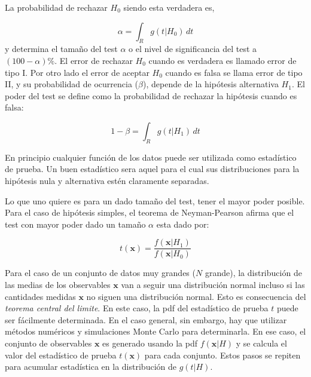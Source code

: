 La probabilidad de rechazar $H_0$ siendo esta verdadera es,

\begin{equation}
  \alpha = \int_{R} g(t|H_0)\, dt
\end{equation}
%
y determina el tama\~no del test $\alpha$ o el nivel de significancia del test a
$(100 - \alpha) \%$. El error de rechazar $H_0$ cuando es verdadera es llamado
error de tipo I. Por otro lado el error de aceptar $H_0$ cuando es falsa se
llama error de tipo II, y su probabilidad de ocurrencia ($\beta$), depende de la
hipótesis alternativa $H_1$. El poder del test se define como la probabilidad de
rechazar la hipótesis cuando es falsa:

\begin{equation}
1-\beta = \int_R g(t|H_1)\, dt
\end{equation}

En principio cualquier función de los datos puede ser utilizada como estadístico
de prueba. Un buen estadístico sera aquel para el cual sus distribuciones para
la hipótesis nula y alternativa estén claramente separadas.

Lo que uno quiere es para un dado tama\~no del test, tener el mayor poder
posible. Para el caso de hipótesis simples, el teorema de Neyman-Pearson afirma
que el test con mayor poder dado un tama\~no $\alpha$ esta dado por:




\begin{equation}
  t(\bm{x}) = \frac{f(\bm{x}|H_1)}{f(\bm{x}|H_0)}
\end{equation}

Para el caso de un conjunto de datos muy grandes ($N$ grande), la distribución
de las medias de los observables $\bm{x}$ van a seguir una distribución normal
incluso si las cantidades medidas $\bm{x}$ no siguen una distribución normal.
Esto es consecuencia del \emph{teorema central del limite}. En este caso, la pdf
del estadístico de prueba $t$ puede ser fácilmente determinada. En el caso
general, sin embargo, hay que utilizar métodos numéricos y simulaciones Monte
Carlo para determinarla. En ese caso, el conjunto de observables $\bm{x}$ es
generado usando la pdf $f(\bm{x}|H)$ y se calcula el valor del estadístico de
prueba $t(\bm{x})$ para cada conjunto. Estos pasos se repiten para acumular
estadística en la distribución de $g(t|H)$.

